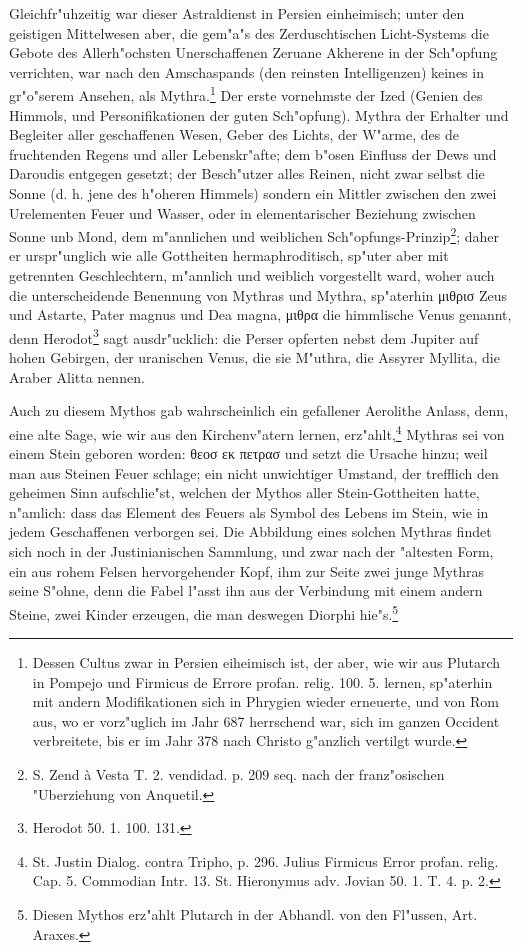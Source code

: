 \documentclass[a4paper, 11pt, oneside, polutonikogreek, german]{article}
\begin{document}
Gleichfr"uhzeitig war dieser Astraldienst in Persien einheimisch; unter den geistigen Mittelwesen aber, die gem"a"s des Zerduschtischen Licht-Systems die Gebote des Allerh"ochsten Unerschaffenen Zeruane Akherene in der Sch"opfung verrichten, war nach den Amschaspands (den reinsten Intelligenzen) keines in gr"o"serem Ansehen, als Mythra.\footnote{Dessen Cultus zwar in Persien eiheimisch ist, der aber, wie wir aus Plutarch in Pompejo und Firmicus de Errore profan. relig. 100. 5. lernen, sp"aterhin mit andern Modifikationen sich in Phrygien wieder erneuerte, und von Rom aus, wo er vorz"uglich im Jahr 687 herrschend war, sich im ganzen Occident verbreitete, bis er im Jahr 378 nach Christo g"anzlich vertilgt wurde.} Der erste vornehmste der Ized (Genien des Himmols, und Personifikationen der guten Sch"opfung). Mythra der Erhalter und Begleiter aller geschaffenen Wesen, Geber des Lichts, der W"arme, des de fruchtenden Regens und aller Lebenskr"afte; dem b"osen Einfluss der Dews und Daroudis entgegen gesetzt; der Besch"utzer alles Reinen, nicht zwar selbst die Sonne (d. h. jene des h"oheren Himmels) sondern ein Mittler zwischen den zwei Urelementen Feuer und Wasser, oder in elementarischer Beziehung zwischen Sonne unb Mond, dem m"annlichen und weiblichen Sch"opfungs-Prinzip\footnote{S. Zend à Vesta T. 2. vendidad. p. 209 seq. nach der franz"osischen "Uberziehung von Anquetil.}; daher er urspr"unglich wie alle Gottheiten hermaphroditisch, sp"uter aber mit getrennten Geschlechtern, m"annlich und weiblich vorgestellt ward, woher auch die unterscheidende Benennung von Mythras und Mythra, sp"aterhin μιθρισ Zeus und Astarte, Pater magnus und Dea magna, μιθρα die himmlische Venus genannt, denn Herodot\footnote{Herodot 50. 1. 100. 131.} sagt ausdr"ucklich: die Perser opferten nebst dem Jupiter auf hohen Gebirgen, der uranischen Venus, die sie M"uthra, die Assyrer Myllita, die Araber Alitta nennen.

Auch zu diesem Mythos gab wahrscheinlich ein gefallener Aerolithe Anlass, denn, eine alte Sage, wie wir aus den Kirchenv"atern lernen, erz"ahlt,\footnote{St. Justin Dialog. contra Tripho, p. 296. Julius Firmicus Error profan. relig. Cap. 5. Commodian Intr. 13. St. Hieronymus adv. Jovian 50. 1. T. 4. p. 2.} Mythras sei von einem Stein geboren worden: θεοσ εκ πετρασ und setzt die Ursache hinzu; weil man aus Steinen Feuer schlage; ein nicht unwichtiger Umstand, der trefflich den geheimen Sinn aufschlie"st, welchen der Mythos aller Stein-Gottheiten hatte, n"amlich: dass das Element des Feuers als Symbol des Lebens im Stein, wie in jedem Geschaffenen verborgen sei. Die Abbildung eines solchen Mythras findet sich noch in der Justinianischen Sammlung, und zwar nach der "altesten Form, ein aus rohem Felsen hervorgehender Kopf, ihm zur Seite zwei junge Mythras seine S"ohne, denn die Fabel l"asst ihn aus der Verbindung mit einem andern Steine, zwei Kinder erzeugen, die man deswegen Diorphi hie"s.\footnote{Diesen Mythos erz"ahlt Plutarch in der Abhandl. von den Fl"ussen, Art. Araxes.}
\end{document}
